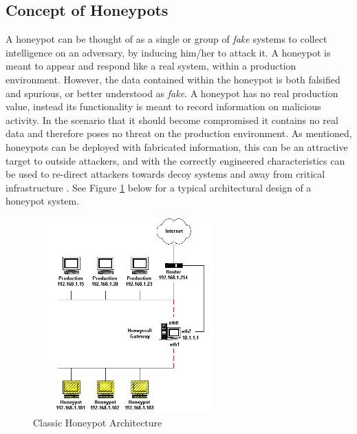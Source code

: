 \documentclass[grad,lot,lof,11pt,oneside,onehalfspace]{RUthesis}
\begin{document}
\subsection{Concept of Honeypots}
A honeypot can be thought of as a single or group of \textit{fake} systems to collect intelligence on an adversary, by inducing him/her to attack it. A honeypot is meant to appear and respond like a real system, within a production environment. However, the data contained within the honeypot is both falsified and spurious, or better understood as \textit{fake}. A honeypot has no real production value, instead its functionality is meant to record information on malicious activity. In the scenario that it should become compromised it contains no real data and therefore poses no threat on the production environment\cite{lihet_how_2015}\cite{suo_research_2014}. As mentioned, honeypots can be deployed with fabricated information, this can be an attractive target to outside attackers, and with the correctly engineered characteristics can be used to re-direct attackers towards decoy systems and away from critical infrastructure \cite{guarnizo_siphon:_2017}. See Figure  \ref{fig:honeypot} below for a typical architectural design of a honeypot system.
\begin{figure}[h]
\centering
\includegraphics[width=7.5cm, height=7.5cm]{"Images/Chapter 2/honeypot"}
\caption{Classic Honeypot Architecture}
\label{fig:honeypot}
\end{figure}
\end{document}
